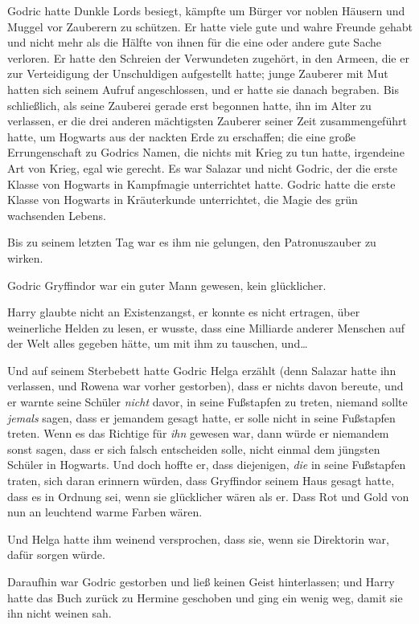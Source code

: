 {Godric hatte Dunkle Lords besiegt, kämpfte um Bürger vor noblen Häusern und Muggel vor Zauberern zu schützen. Er hatte viele gute und wahre Freunde gehabt und nicht mehr als die Hälfte von ihnen für die eine oder andere gute Sache verloren. Er hatte den Schreien der Verwundeten zugehört, in den Armeen, die er zur Verteidigung der Unschuldigen aufgestellt hatte; junge Zauberer mit Mut hatten sich seinem Aufruf angeschlossen, und er hatte sie danach begraben. Bis schließlich, als seine Zauberei gerade erst begonnen hatte, ihn im Alter zu verlassen, er die drei anderen mächtigsten Zauberer seiner Zeit zusammengeführt hatte, um Hogwarts aus der nackten Erde zu erschaffen; die eine große Errungenschaft zu Godrics Namen, die nichts mit Krieg zu tun hatte, irgendeine Art von Krieg, egal wie gerecht. Es war Salazar und nicht Godric, der die erste Klasse von Hogwarts in Kampfmagie unterrichtet hatte. Godric hatte die erste Klasse von Hogwarts in Kräuterkunde unterrichtet, die Magie des grün wachsenden Lebens.

Bis zu seinem letzten Tag war es ihm nie gelungen, den Patronuszauber zu wirken.

Godric Gryffindor war ein guter Mann gewesen, kein glücklicher.

Harry glaubte nicht an Existenzangst, er konnte es nicht ertragen, über weinerliche Helden zu lesen, er wusste, dass eine Milliarde anderer Menschen auf der Welt alles gegeben hätte, um mit ihm zu tauschen, und…

Und auf seinem Sterbebett hatte Godric Helga erzählt (denn Salazar hatte ihn verlassen, und Rowena war vorher gestorben), dass er nichts davon bereute, und er warnte seine Schüler \emph{nicht} davor, in seine Fußstapfen zu treten, niemand sollte \emph{jemals} sagen, dass er jemandem gesagt hatte, er solle nicht in seine Fußstapfen treten. Wenn es das Richtige für \emph{ihn} gewesen war, dann würde er niemandem sonst sagen, dass er sich falsch entscheiden solle, nicht einmal dem jüngsten Schüler in Hogwarts. Und doch hoffte er, dass diejenigen, \emph{die} in seine Fußstapfen traten, sich daran erinnern würden, dass Gryffindor seinem Haus gesagt hatte, dass es in Ordnung sei, wenn sie glücklicher wären als er. Dass Rot und Gold von nun an leuchtend warme Farben wären.

Und Helga hatte ihm weinend versprochen, dass sie, wenn sie Direktorin war, dafür sorgen würde.

Daraufhin war Godric gestorben und ließ keinen Geist hinterlassen; und Harry hatte das Buch zurück zu Hermine geschoben und ging ein wenig weg, damit sie ihn nicht weinen sah.

}
